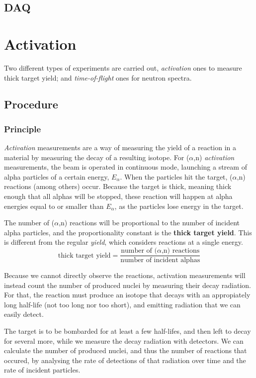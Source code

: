 \documentclass[a4paper,12pt]{report}
\newcommand{\an}{($\alpha$,n) }
\begin{document}
\section{DAQ}


\chapter{Activation}
Two different types of experiments are carried out, \textit{activation} ones to measure thick target yield; and \textit{time-of-flight} ones for neutron spectra.

\section{Procedure}

\subsection{Principle}
\textit{Activation} measurements are a way of measuring the yield of a reaction in a material by measuring the decay of a resulting isotope.
For \an \textit{activation} measurements, the beam is operated in continuous mode, launching a stream of alpha particles of a certain energy, $E_\alpha$.
When the particles hit the target, \an reactions (among others) occur.
Because the target is thick, meaning thick enough that all alphas will be stopped, these reaction will happen at alpha energies equal to or smaller than $E_\alpha$, as the particles lose energy in the target.

The number of \an reactions will be proportional to the number of incident alpha particles, and the proportionality constant is the \textbf{thick target yield}.
This is different from the regular \textit{yield}, which considers reactions at a single energy.
\begin{equation}
	\text{thick target yield} = \frac{\text{number of \an reactions}}{\text{number of incident alphas}}
	\label{tty_def}
\end{equation}

Because we cannot directly observe the reactions, activation measurements will instead count the number of produced nuclei by measuring their decay radiation.
For that, the reaction must produce an isotope that decays with an appropiately long half-life (not too long nor too short), and emitting radiation that we can easily detect.

The target is to be bombarded for at least a few half-lifes, and then left to decay for several more, while we measure the decay radiation with detectors.
We can calculate the number of produced nuclei, and thus the number of reactions that occured, by analysing the rate of detections of that radiation over time and the rate of incident particles.
\end{document}
